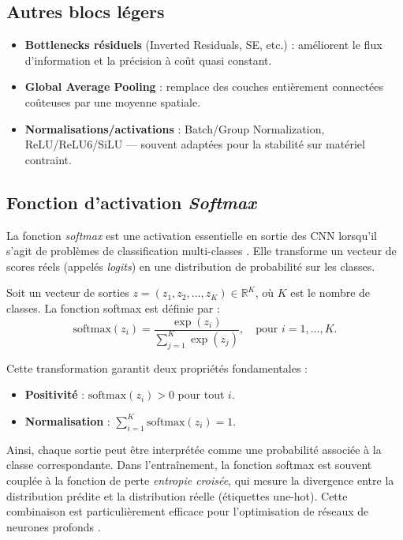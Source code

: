 \subsection{Autres blocs légers}
\begin{itemize}
    \item \textbf{Bottlenecks résiduels} (Inverted Residuals, SE, etc.) : améliorent le flux d’information et la précision à coût quasi constant.
    \item \textbf{Global Average Pooling} : remplace des couches entièrement connectées coûteuses par une moyenne spatiale.
    \item \textbf{Normalisations/activations} : Batch/Group Normalization, ReLU/ReLU6/SiLU — souvent adaptées pour la stabilité sur matériel contraint.
\end{itemize}

\subsection{Fonction d’activation \textit{Softmax}}
La fonction \textit{softmax} est une activation essentielle en sortie des CNN lorsqu’il s’agit de problèmes de classification multi-classes \cite{goodfellow2016deep, bishop2006pattern}. Elle transforme un vecteur de scores réels (appelés \emph{logits}) en une distribution de probabilité sur les classes.

Soit un vecteur de sorties $z = (z_1, z_2, \dots, z_K) \in \mathbb{R}^K$, où $K$ est le nombre de classes. La fonction softmax est définie par :
\begin{equation}
    \label{eq:softmax}
    \mathrm{softmax}(z_i) = \frac{\exp(z_i)}{\sum_{j=1}^{K} \exp(z_j)}, \quad \text{pour } i = 1, \dots, K.
\end{equation}

Cette transformation garantit deux propriétés fondamentales :
\begin{itemize}
    \item \textbf{Positivité} : $\mathrm{softmax}(z_i) > 0$ pour tout $i$.
    \item \textbf{Normalisation} : $\sum_{i=1}^{K} \mathrm{softmax}(z_i) = 1$.
\end{itemize}

Ainsi, chaque sortie peut être interprétée comme une probabilité associée à la classe correspondante. Dans l’entraînement, la fonction softmax est souvent couplée à la fonction de perte \emph{entropie croisée}, qui mesure la divergence entre la distribution prédite et la distribution réelle (étiquettes une-hot). Cette combinaison est particulièrement efficace pour l’optimisation de réseaux de neurones profonds \cite{goodfellow2016deep}.

